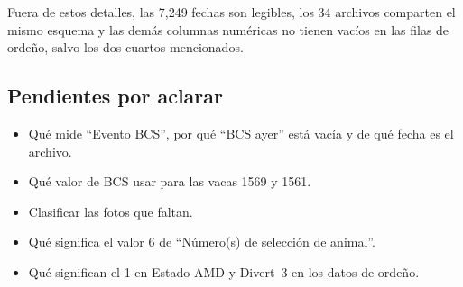 \documentclass[11pt,letterpaper,DIV=12]{scrartcl}
\begin{document}
Fuera de estos detalles, las 7,249 fechas son legibles, los 34 archivos comparten el mismo esquema y las demás columnas numéricas no tienen vacíos en las filas de ordeño, salvo los dos cuartos mencionados.

\subsection{Pendientes por aclarar}

\begin{itemize}
  \item Qué mide ``Evento BCS'', por qué ``BCS ayer'' está vacía y de qué fecha es el archivo.
  \item Qué valor de BCS usar para las vacas 1569 y 1561.
  \item Clasificar las fotos que faltan.
  \item Qué significa el valor 6 de ``Número(s) de selección de animal''.
  \item Qué significan el 1 en Estado AMD y Divert~3 en los datos de ordeño.
\end{itemize}

\clearpage


\printbibliography
\end{document}
